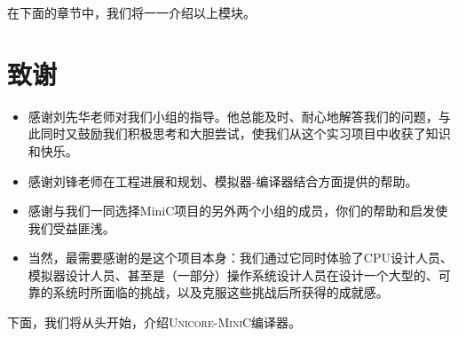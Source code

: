 在下面的章节中，我们将一一介绍以上模块。%

\section*{致谢}
\begin{itemize}
\item 感谢刘先华老师对我们小组的指导。他总能及时、耐心地解答我们的问题，与此同时又鼓励我们积极思考和大胆尝试，使我们从这个实习项目中收获了知识和快乐。

\item 感谢刘锋老师在工程进展和规划、模拟器-编译器结合方面提供的帮助。

\item 感谢与我们一同选择MiniC项目的另外两个小组的成员，你们的帮助和启发使我们受益匪浅。

\item 当然，最需要感谢的是这个项目本身：我们通过它同时体验了CPU设计人员、模拟器设计人员、甚至是（一部分）操作系统设计人员在设计一个大型的、可靠的系统时所面临的挑战，以及克服这些挑战后所获得的成就感。
\end{itemize}

下面，我们将从头开始，介绍\textsc{Unicore-MiniC}编译器。

